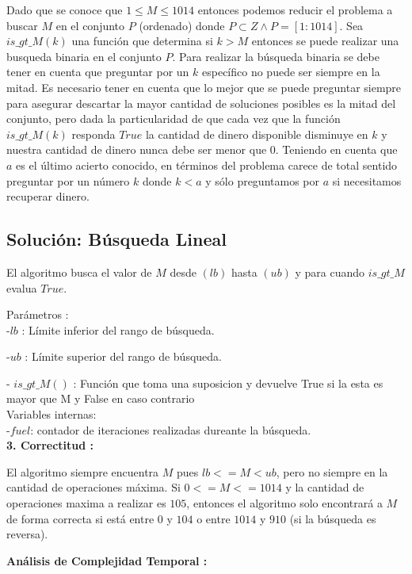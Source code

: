 \documentclass[
10pt, %
a4paper, %
oneside, %
headinclude,footinclude, %
BCOR5mm, %
]{scrartcl}
\begin{document}
Dado que se conoce que $1 \leq M \leq 1014$ entonces podemos reducir el problema a buscar $M$ en el conjunto $P$ (ordenado) donde $P \subset Z \wedge P = [1:1014]$. Sea $is\_ gt\_ M(k)$ una función que determina si $k > M$ entonces se puede realizar una busqueda binaria en el conjunto $P$.
Para realizar la búsqueda binaria se debe tener en cuenta que preguntar por un $k$ específico no puede ser siempre en la mitad. Es necesario tener en cuenta que lo mejor que se puede preguntar siempre para asegurar descartar la mayor cantidad de soluciones posibles es la mitad del conjunto,
pero dada la particularidad de que cada vez que la función $is\_ gt\_ M(k)$ responda $True$ la cantidad de dinero disponible disminuye en $k$ y nuestra cantidad de dinero nunca debe  ser menor que $0$.
Teniendo en cuenta que $a$ es el último acierto conocido, en términos del problema carece de total sentido preguntar por un número $k$ donde $k<a$ y sólo preguntamos por $a$ si necesitamos recuperar dinero. 

\subsection{Solución: Búsqueda Lineal}
El algoritmo busca el valor de $M$ desde $(lb)$ hasta $(ub)$ y para cuando $is\_gt\_M$ evalua $True$.

Parámetros :\\

-$lb$ : Límite inferior del rango de búsqueda.


-$ub$ : Límite superior del rango de búsqueda.


- $is\_gt\_M()$ : Función que toma una suposicion y devuelve True si la esta es mayor que M y False en caso contrario\\

Variables internas: \\

-$fuel$: contador de iteraciones realizadas dureante la búsqueda. \\

\textbf{3. Correctitud :} 

El algoritmo siempre encuentra $M$ pues $lb <= M < ub$, pero no siempre en la cantidad de operaciones máxima. Si
$0 <= M <= 1014$ y la cantidad de operaciones maxima a realizar es $105$, entonces el algoritmo solo encontrará a $M$
de forma correcta si está entre $0$ y $104$ o entre $1014$ y $910$ (si la búsqueda es reversa).

\textbf{Análisis de Complejidad Temporal :}\\
\end{document}
